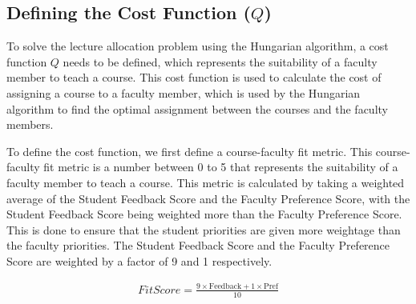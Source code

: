 
\subsection{Defining the Cost Function (\texorpdfstring{$Q$}{Q})}
\label{sec:defining_the_cost_function}

To solve the lecture allocation problem using the Hungarian algorithm, a cost function \(Q\) needs to be defined, which represents the suitability of a faculty member to teach a course. This cost function is used to calculate the cost of assigning a course to a faculty member, which is used by the Hungarian algorithm to find the optimal assignment between the courses and the faculty members.

To define the cost function, we first define a course-faculty fit metric. This course-faculty fit metric is a number between 0 to 5 that represents the suitability of a faculty member to teach a course. This metric is calculated by taking a weighted average of the Student Feedback Score and the Faculty Preference Score, with the Student Feedback Score being weighted more than the Faculty Preference Score. This is done to ensure that the student priorities are given more weightage than the faculty priorities. The Student Feedback Score and the Faculty Preference Score are weighted by a factor of 9 and 1 respectively.

\begin{equation}
  \label{eq:course_faculty_fit}
  \begin{aligned}
    FitScore = \frac{9 \times \text{Feedback} + 1 \times \text{Pref}}{10}
  \end{aligned}
\end{equation}

